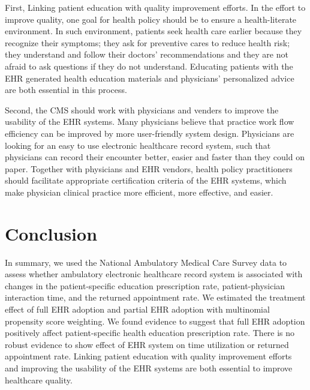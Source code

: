 \documentclass[12pt]{report}
\begin{document}
First, Linking patient education with quality improvement efforts. In the effort to improve quality, one goal for health policy should be to ensure a health-literate environment. In such environment, patients seek health care earlier because they recognize their symptoms; they ask for preventive cares to reduce health risk; they understand and follow their doctors' recommendations and they are not afraid to ask questions if they do not understand. Educating patients with the EHR generated health education materials and physicians' personalized advice are both essential in this process. 

Second, the CMS should work with physicians and venders to improve the usability of the EHR systems. Many physicians believe that practice work flow efficiency can be improved by more user-friendly system design. Physicians are looking for an easy to use electronic healthcare record system, such that physicians can record their encounter better, easier and faster than they could on paper. Together with physicians and EHR vendors, health policy practitioners should facilitate appropriate certification criteria of the EHR systems, which make physician clinical practice more efficient, more effective, and easier. 

\chapter{Conclusion}
\label{chapter:conclusion}
In summary, we used the National Ambulatory Medical Care Survey data to assess whether ambulatory electronic healthcare record system is associated with changes in the patient-specific education prescription rate, patient-physician interaction time, and the returned appointment rate. We estimated the treatment effect of full EHR adoption and partial EHR adoption with multinomial propensity score weighting. We found evidence to suggest that full EHR adoption positively affect patient-specific health education prescription rate. There is no robust evidence to show effect of EHR system on time utilization or returned appointment rate. Linking patient education with quality improvement efforts and improving the usability of the EHR systems are both essential to improve healthcare quality.

\newpage


\end{document}
